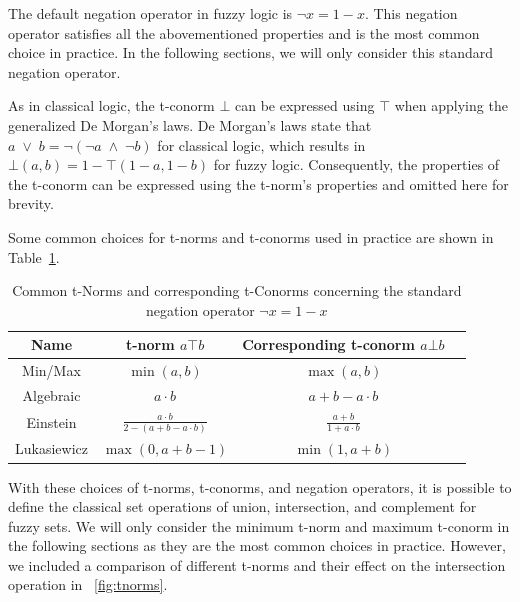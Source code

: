 The default negation operator in fuzzy logic is $\neg x = 1 - x$. This negation operator satisfies all the abovementioned properties and is the most common choice in practice. In the following sections, we will only consider this standard negation operator.

As in classical logic, the t-conorm $\bot$ can be expressed using $\top$ when applying the generalized De Morgan's laws. De Morgan's laws state that $a \; \lor \; b = \neg(\neg a \; \land \; \neg b)$ for classical logic, which results in $\bot(a, b) = 1 - \top(1 - a, 1 - b)$ for fuzzy logic. Consequently, the properties of the t-conorm can be expressed using the t-norm's properties and omitted here for brevity.


Some common choices for t-norms and t-conorms used in practice are shown in Table~\ref{tab:tnorms}.



\begin{table}[H]
      \centering
      {\renewcommand{\arraystretch}{1.2}
            \begin{tabular}{|c|c|c|c|}
                  \hline
                  Name        & t-norm   $a \top b$                         & Corresponding t-conorm      $a \bot b$ \\
                  \hline
                  Min/Max     & $\min(a, b)$                                & $\max(a, b)$                           \\
                  Algebraic   & $a \cdot b$                                 & $a + b - a \cdot b$                    \\
                  Einstein    & $\frac{a \cdot b}{2 - (a + b - a \cdot b)}$ & $\frac{a + b}{1 + a \cdot b}$          \\
                  Lukasiewicz & $\max(0, a + b - 1)$                        & $\min(1, a + b)$                       \\
                  \hline
            \end{tabular}
      }
      \caption[
            Commonly used t-norms and t-conorms in Fuzzy Logic]{Common t-Norms and corresponding t-Conorms concerning the standard negation operator $\neg x = 1 - x$}
      \label{tab:tnorms}
\end{table}


With these choices of t-norms, t-conorms, and negation operators, it is possible to define the classical set operations of union, intersection, and complement for fuzzy sets. We will only consider the minimum t-norm and maximum t-conorm in the following sections as they are the most common choices in practice. However, we included a comparison of different t-norms and their effect on the intersection operation in ~\autoref{fig:tnorms}.

